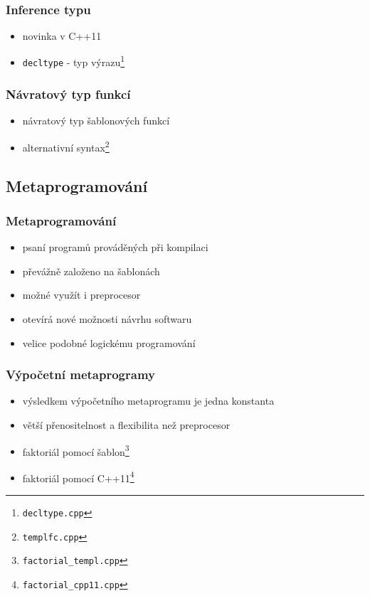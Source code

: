 \begin{frame} \frametitle{Inference typu}
	\begin{itemize}
		\item{novinka v C++11}
		\item{\texttt{decltype} - typ výrazu\footnote{\texttt{decltype.cpp}}}
	\end{itemize}
\end{frame}

\begin{frame} \frametitle{Návratový typ funkcí}
	\begin{itemize}
		\item{návratový typ šablonových funkcí}
		\item{alternativní syntax\footnote{\texttt{templfc.cpp}}}
	\end{itemize}
\end{frame}

\subsection{Metaprogramování}

\begin{frame} \frametitle{Metaprogramování}
	\begin{itemize}
		\item{psaní programů prováděných při kompilaci}
		\item{převážně založeno na šablonách}
		\item{možné využít i preprocesor}
		\item{otevírá nové možnosti návrhu softwaru}
		\item{velice podobné logickému programování}
	\end{itemize}
\end{frame}

\begin{frame} \frametitle{Výpočetní metaprogramy}
	\begin{itemize}
		\item{výsledkem výpočetního metaprogramu je jedna konstanta}
		\item{větší přenositelnost a flexibilita než preprocesor}
		\item{faktoriál pomocí šablon\footnote{\texttt{factorial\_templ.cpp}}}
		\item{faktoriál pomocí C++11\footnote{\texttt{factorial\_cpp11.cpp}}}
	\end{itemize}
\end{frame}


